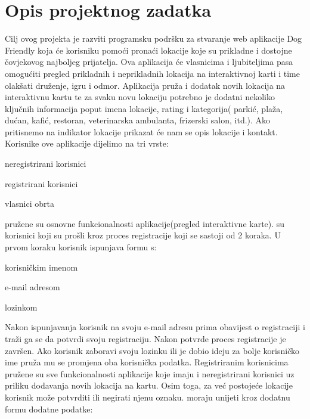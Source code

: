 \chapter{Opis projektnog zadatka}
		
Cilj ovog projekta je razviti programsku podršku za stvaranje web aplikacije Dog Friendly koja će korisniku pomoći pronaći lokacije koje su prikladne i dostojne čovjekovog najboljeg prijatelja. Ova aplikacija  će vlasnicima i ljubiteljima pasa omogućiti pregled prikladnih i neprikladnih lokacija na interaktivnoj karti i time olakšati  druženje, igru i odmor.
Aplikacija  pruža i dodatak novih lokacija na interaktivnu kartu te za svaku novu lokaciju potrebno je dodatni nekoliko ključnih informacija poput imena lokacije, rating i kategorija( parkić, plaža, dućan, kafić, restoran, veterinarska
ambulanta, frizerski salon, itd.). Ako pritisnemo na indikator lokacije prikazat će nam se opis lokacije i kontakt. 
Korisnike ove aplikacije dijelimo na tri vrste:
\begin{packed_item}
	
	\item  neregistrirani korisnici
	\item  registrirani korisnici
	\item  vlasnici obrta
\end{packed_item}
 pružene su osnovne funkcionalnosti aplikacije(pregled interaktivne karte). 
\newline {} su korisnici koji su prošli kroz proces registracije koji se sastoji od 2 koraka. U prvom koraku korisnik ispunjava formu s:
\begin{packed_item}
	
	\item  korisničkim imenom
	\item   e-mail adresom
	\item  lozinkom
\end{packed_item}Nakon ispunjavanja korisnik na svoju e-mail adresu prima obavijest o registraciji i traži ga se da potvrdi svoju registraciju. Nakon potvrde proces registracije je završen. Ako korisnik zaboravi svoju lozinku ili je dobio ideju za bolje korisničko ime pruža mu se promjena oba korisnička podatka. Registriranim korisnicima pružene su sve funkcionalnosti aplikacije koje imaju i neregistrirani korisnici uz priliku dodavanja novih lokacija na kartu. Osim toga, za već postojeće lokacije korisnik može potvrditi ili negirati njenu oznaku. 
\newline  {} moraju unijeti kroz dodatnu formu dodatne podatke:
